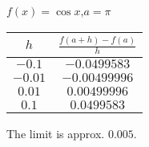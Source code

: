 {$\displaystyle f(x) =\cos x$,\quad  $a=\pi$}
{\begin{tabular}{cc}
$h$ & $\frac{f(a+h)-f(a)}{h}$\\ \hline 
 $-0.1$ & $-0.0499583$ \\
 $-0.01$ & $-0.00499996$ \\
 $0.01$ & $0.00499996$ \\
 $0.1$ & $0.0499583$
\end{tabular}
The limit is approx. $0.005$.
}
